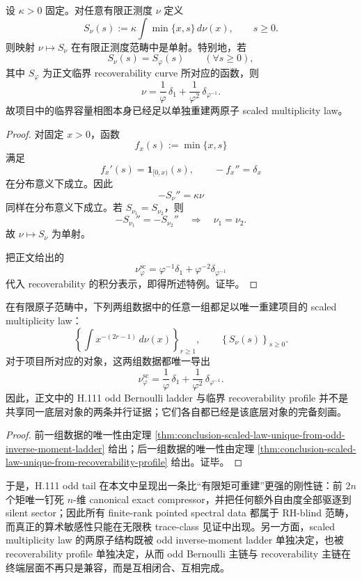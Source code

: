 \begin{theorem}\label{thm:conclusion-scaled-law-unique-from-recoverability-profile}
设 \(\kappa>0\) 固定。对任意有限正测度 \(\nu\) 定义
\[
S_\nu(s):=\kappa\int \min\{x,s\}\,d\nu(x),
\qquad
s\ge 0.
\]
则映射 \(\nu\mapsto S_\nu\) 在有限正测度范畴中是单射。特别地，若
\[
S_\nu(s)=S_\varphi(s)
\qquad (\forall s\ge 0),
\]
其中 \(S_\varphi\) 为正文临界 recoverability curve 所对应的函数，则
\[
\nu=\frac1\varphi\,\delta_1+\frac1{\varphi^2}\,\delta_{\varphi^{-1}}.
\]
故项目中的临界容量相图本身已经足以单独重建两原子 scaled multiplicity law。
\end{theorem}
\begin{proof}
对固定 \(x>0\)，函数
\[
f_x(s):=\min\{x,s\}
\]
满足
\[
f_x'(s)=\mathbf 1_{[0,x)}(s),
\qquad
-f_x''=\delta_x
\]
在分布意义下成立。因此
\[
-S_\nu''=\kappa\nu
\]
同样在分布意义下成立。若 \(S_{\nu_1}=S_{\nu_2}\)，则
\[
-S_{\nu_1}''=-S_{\nu_2}''
\quad\Longrightarrow\quad
\nu_1=\nu_2.
\]
故 \(\nu\mapsto S_\nu\) 为单射。

把正文给出的
\[
\nu_\varphi^{\mathrm{sc}}
=
\varphi^{-1}\delta_1+\varphi^{-2}\delta_{\varphi^{-1}}
\]
代入 recoverability 的积分表示，即得所述特例。证毕。
\end{proof}

\begin{corollary}\label{cor:conclusion-scaled-law-two-chains-mutually-determining}
在有限原子范畴中，下列两组数据中的任意一组都足以唯一重建项目的 scaled multiplicity law：
\[
\left\{
\int x^{-(2r-1)}\,d\nu(x)
\right\}_{r\ge 1},
\qquad
\left\{
S_\nu(s)
\right\}_{s\ge 0}.
\]
对于项目所对应的对象，这两组数据都唯一导出
\[
\nu_\varphi^{\mathrm{sc}}
=
\frac1\varphi\,\delta_1+\frac1{\varphi^2}\,\delta_{\varphi^{-1}}.
\]
因此，正文中的 H.111 odd Bernoulli ladder 与临界 recoverability profile 并不是共享同一底层对象的两条并行证据；它们各自都已经是该底层对象的完备刻画。
\end{corollary}
\begin{proof}
前一组数据的唯一性由定理 \ref{thm:conclusion-scaled-law-unique-from-odd-inverse-moment-ladder} 给出；后一组数据的唯一性由定理 \ref{thm:conclusion-scaled-law-unique-from-recoverability-profile} 给出。证毕。
\end{proof}

\noindent
于是，H.111 odd tail 在本文中呈现出一条比“有限矩可重建”更强的刚性链：前 \(2n\) 个矩唯一钉死 \(n\)-维 canonical exact compressor，并把任何额外自由度全部驱逐到 silent sector；因此所有 finite-rank pointed spectral data 都属于 RH-blind 范畴，而真正的算术敏感性只能在无限秩 trace-class 见证中出现。另一方面，scaled multiplicity law 的两原子结构既被 odd inverse-moment ladder 单独决定，也被 recoverability profile 单独决定，从而 odd Bernoulli 主链与 recoverability 主链在终端层面不再只是兼容，而是互相闭合、互相完成。

\endinput
